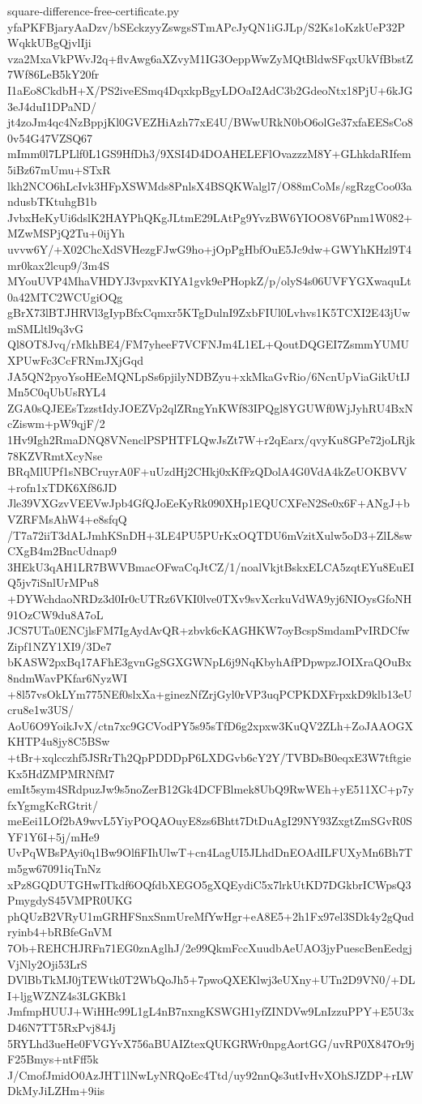 \documentclass[11pt]{article}
\theoremstyle{definition}
\theoremstyle{remark}
\begin{document}
\begin{filecontents*}[overwrite]{square-difference-free-certificate.py}
yfaPKFBjaryAaDzv/bSEckzyyZswgsSTmAPcJyQN1iGJLp/S2Ks1oKzkUeP32PWqkkUBgQjvlIji
vza2MxaVkPWvJ2q+flvAwg6aXZvyM1IG3OeppWwZyMQtBldwSFqxUkVfBbstZ7Wf86LeB5kY20fr
I1aEo8CkdbH+X/PS2iveESmq4DqxkpBgyLDOaI2AdC3b2GdeoNtx18PjU+6kJG3eJ4duI1DPaND/
jt4zoJm4qc4NzBppjKl0GVEZHiAzh77xE4U/BWwURkN0bO6olGe37xfaEESsCo80v54G47VZSQ67
mImm0l7LPLlf0L1GS9HfDh3/9XSI4D4DOAHELEFlOvazzzM8Y+GLhkdaRIfem5iBz67mUmu+STxR
lkh2NCO6hLcIvk3HFpXSWMds8PnlsX4BSQKWalgl7/O88mCoMs/sgRzgCoo03andusbTKtuhgB1b
JvbxHeKyUi6dslK2HAYPhQKgJLtmE29LAtPg9YvzBW6YIOO8V6Pnm1W082+MZwMSPjQ2Tu+0ijYh
uvvw6Y/+X02ChcXdSVHezgFJwG9ho+jOpPgHbfOuE5Jc9dw+GWYhKHzl9T4mr0kax2lcup9/3m4S
MYouUVP4MhaVHDYJ3vpxvKIYA1gvk9ePHopkZ/p/olyS4s06UVFYGXwaquLt0a42MTC2WCUgiOQg
gBrX73lBTJHRVl3gIypBfxCqmxr5KTgDulnI9ZxbFIUl0Lvhvs1K5TCXI2E43jUwmSMLltl9q3vG
Ql8OT8Jvq/rMkhBE4/FM7yheeF7VCFNJm4L1EL+QoutDQGEI7ZsmmYUMUXPUwFc3CcFRNmJXjGqd
JA5QN2pyoYsoHEeMQNLpSs6pjilyNDBZyu+xkMkaGvRio/6NcnUpViaGikUtIJMn5C0qUbUsRYL4
ZGA0sQJEEsTzzstIdyJOEZVp2qlZRngYnKWf83IPQgl8YGUWf0WjJyhRU4BxNcZiswm+pW9qjF/2
1Hv9Igh2RmaDNQ8VNenclPSPHTFLQwJsZt7W+r2qEarx/qvyKu8GPe72joLRjk78KZVRmtXcyNse
BRqMlUPf1sNBCruyrA0F+uUzdHj2CHkj0xKfFzQDolA4G0VdA4kZeUOKBVV+rofn1xTDK6Xf86JD
Jle39VXGzvVEEVwJpb4GfQJoEeKyRk090XHp1EQUCXFeN2Se0x6F+ANgJ+bVZRFMsAhW4+e8sfqQ
/T7a72iiT3dALJmhKSnDH+3LE4PU5PUrKxOQTDU6mVzitXulw5oD3+ZlL8swCXgB4m2BncUdnap9
3HEkU3qAH1LR7BWVBmacOFwaCqJtCZ/1/noalVkjtBskxELCA5zqtEYu8EuEIQ5jv7iSnlUrMPu8
+DYWchdaoNRDz3d0Ir0cUTRz6VKI0lve0TXv9svXcrkuVdWA9yj6NIOysGfoNH91OzCW9du8A7oL
JCS7UTa0ENCjlsFM7IgAydAvQR+zbvk6cKAGHKW7oyBcspSmdamPvIRDCfwZipf1NZY1XI9/3De7
bKASW2pxBq17AFhE3gvnGgSGXGWNpL6j9NqKbyhAfPDpwpzJOIXraQOuBx8ndmWavPKfar6NyzWI
+8l57vsOkLYm775NEf0slxXa+ginezNfZrjGyl0rVP3uqPCPKDXFrpxkD9klb13eUcru8e1w3US/
AoU6O9YoikJvX/ctn7xc9GCVodPY5s95sTfD6g2xpxw3KuQV2ZLh+ZoJAAOGXKHTP4u8jy8C5BSw
+tBr+xqlcczhf5JSRrTh2QpPDDDpP6LXDGvb6cY2Y/TVBDsB0eqxE3W7tftgieKx5HdZMPMRNfM7
emIt5sym4SRdpuzJw9s5noZerB12Gk4DCFBlmek8UbQ9RwWEh+yE511XC+p7yfxYgmgKcRGtrit/
meEei1LOf2bA9wvL5YiyPOQAOuyE8zs6Bhtt7DtDuAgI29NY93ZxgtZmSGvR0SYF1Y6I+5j/mHe9
UvPqWBsPAyi0q1Bw9OlfiFIhUlwT+cn4LagUI5JLhdDnEOAdILFUXyMn6Bh7Tm5gw67091iqTnNz
xPz8GQDUTGHwITkdf6OQfdbXEGO5gXQEydiC5x7lrkUtKD7DGkbrICWpsQ3PmygdyS45VMPR0UKG
phQUzB2VRyU1mGRHFSnxSnmUreMfYwHgr+eA8E5+2h1Fx97el3SDk4y2gQudryinb4+bRBfeGnVM
7Ob+REHCHJRFn71EG0znAglhJ/2e99QkmFccXuudbAeUAO3jyPuescBenEedgjVjNly2Oji53LrS
DVlBbTkMJ0jTEWtk0T2WbQoJh5+7pwoQXEKlwj3eUXny+UTn2D9VN0/+DLI+ljgWZNZ4s3LGKBk1
JmfmpHUUJ+WiHHc99L1gL4nB7nxngKSWGH1yfZINDVw9LnIzzuPPY+E5U3xD46N7TT5RxPvj84Jj
5RYLhd3ueHe0FVGYvX756aBUAIZtexQUKGRWr0npgAortGG/uvRP0X847Or9jF25Bmys+ntFff5k
J/CmofJmidO0AzJHT1lNwLyNRQoEc4Ttd/uy92nnQs3utIvHvXOhSJZDP+rLWDkMyJiLZHm+9iis

\end{filecontents*}
\end{document}
